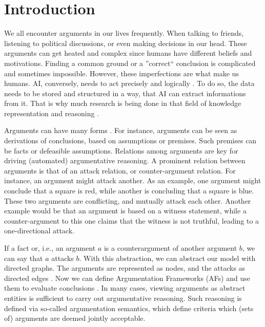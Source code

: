 \chapter{Introduction}
We all encounter arguments in our lives frequently. When talking to friends, listening to political discussions, or even making decisions in our head. These arguments can get heated and complex since humans have different beliefs and motivations. Finding a common ground or a ''correct`` conclusion is complicated and sometimes impossible. However, these imperfections are what make us humans. \ac{AI}, conversely, needs to act precisely and logically \cite{DBLP:journals/frai/DietzKM24}. To do so, the data needs to be stored and structured in a way, that AI can extract informations from it. That is why much research is being done in that field of knowledge representation and reasoning \cite{DBLP:journals/dagstuhl-manifestos/DelgrandeG0TW24, DBLP:journals/inffus/PopescuD23}.

Arguments can have many forms \cite{Toulmin_2003}. For instance, arguments can be seen as derivations of conclusions, based on assumptions or premises. Such premises can be facts or defeasible assumptions. Relations among arguments are key for driving (automated) argumentative reasoning. A prominent relation between arguments is that of an attack relation, or counter-argument relation. For instance, an argument might attack another. As an example, one argument might conclude that a square is red, while another is concluding that a square is blue. These two arguments are conflicting, and mutually attack each other. Another example would be that an argument is based on a witness statement, while a counter-argument to this one claims that the witness is not truthful, leading to a one-directional attack.



If a fact or, i.e., an argument $a$ is a counterargument of another argument $b$, we can say that $a$ attacks $b$. With this abstraction, we can abstract our model with directed graphs. The arguments are represented as nodes, and the attacks as directed edges \cite{DUNG1995321}. Now we can define Argumentation Frameworks (AFs) and use them to evaluate conclusions \cite{DBLP:conf/fapr/Geffner96}. In many cases, viewing arguments as abstract entities is sufficient to carry out argumentative reasoning. Such reasoning is defined via so-called argumentation semantics, which define criteria which (sets of) arguments are deemed jointly acceptable.

